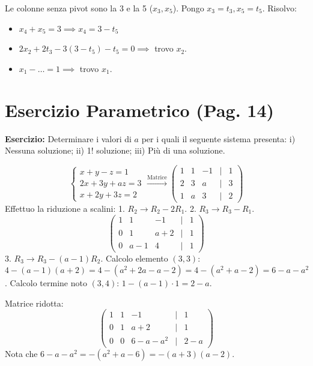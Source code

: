 Le colonne senza pivot sono la 3 e la 5 ($x_3, x_5$).
Pongo $x_3 = t_3, x_5 = t_5$.
Risolvo:
\begin{itemize}
    \item $x_4 + x_5 = 3 \implies x_4 = 3 - t_5$
    \item $2x_2 + 2t_3 - 3(3-t_5) - t_5 = 0 \implies$ trovo $x_2$.
    \item $x_1 - \dots = 1 \implies$ trovo $x_1$.
\end{itemize}

\section{Esercizio Parametrico (Pag. 14)}

\textbf{Esercizio:} Determinare i valori di $a$ per i quali il seguente sistema presenta:
i) Nessuna soluzione; ii) 1! soluzione; iii) Più di una soluzione.

\[
\begin{cases}
x + y - z = 1 \\
2x + 3y + az = 3 \\
x + 2y + 3z = 2
\end{cases}
\xrightarrow{\text{Matrice}}
\begin{pmatrix}
1 & 1 & -1 & | & 1 \\
2 & 3 & a & | & 3 \\
1 & a & 3 & | & 2
\end{pmatrix}
\]
Effettuo la riduzione a scalini:
1. $R_2 \to R_2 - 2R_1$.
2. $R_3 \to R_3 - R_1$.
\[
\begin{pmatrix}
1 & 1 & -1 & | & 1 \\
0 & 1 & a+2 & | & 1 \\
0 & a-1 & 4 & | & 1
\end{pmatrix}
\]
3. $R_3 \to R_3 - (a-1)R_2$.
Calcolo elemento $(3,3)$: $4 - (a-1)(a+2) = 4 - (a^2+2a-a-2) = 4 - (a^2+a-2) = 6 - a - a^2$.
Calcolo termine noto $(3,4)$: $1 - (a-1)\cdot 1 = 2 - a$.

Matrice ridotta:
\[
\begin{pmatrix}
1 & 1 & -1 & | & 1 \\
0 & 1 & a+2 & | & 1 \\
0 & 0 & 6-a-a^2 & | & 2-a
\end{pmatrix}
\]
Nota che $6-a-a^2 = -(a^2+a-6) = -(a+3)(a-2)$.

